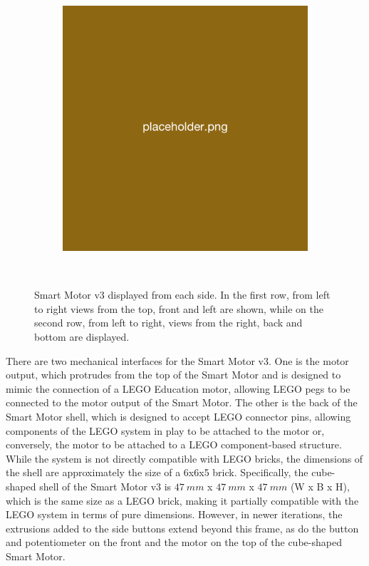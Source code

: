 \begin{figure}[H]
\begin{subfigure}[b]{0.25\textwidth}
    \end{subfigure}
    \begin{subfigure}[b]{0.25\textwidth}
        \includegraphics[width=\linewidth]{overleaf/images/placeholder.png}
    \end{subfigure}
    \\\vspace{\ftspace}
    \caption{Smart Motor v3 displayed from each side. In the first row, from left to right views from the top, front and left are shown, while on the second row, from left to right, views from the right, back and bottom are displayed.}
    \vspace{\ftspace}
    \label{fig:smv3_hardware}
\end{figure}

There are two mechanical interfaces for the Smart Motor v3. One is the motor output, which protrudes from the top of the Smart Motor and is designed to mimic the connection of a LEGO Education motor, allowing LEGO pegs to be connected to the motor output of the Smart Motor. The other is the back of the Smart Motor shell, which is designed to accept LEGO connector pins, allowing components of the LEGO system in play to be attached to the motor or, conversely, the motor to be attached to a LEGO component-based structure. While the system is not directly compatible with LEGO bricks, the dimensions of the shell are approximately the size of a 6x6x5 brick. Specifically, the cube-shaped shell of the Smart Motor v3 is $47\ mm$ x $47\ mm$ x $47\ mm$ (W x B x H), which is the same size as a LEGO brick, making it partially compatible with the LEGO system in terms of pure dimensions. However, in newer iterations, the extrusions added to the side buttons extend beyond this frame, as do the button and potentiometer on the front and the motor on the top of the cube-shaped Smart Motor.


